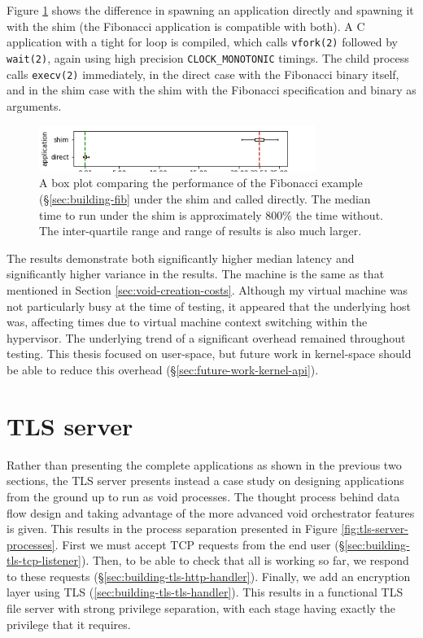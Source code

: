 \documentclass[12pt,a4paper,twoside]{report}
\begin{document}
Figure \ref{fig:fib-launch-times} shows the difference in spawning an application directly and spawning it with the shim (the Fibonacci application is compatible with both). A C application with a tight for loop is compiled, which calls \texttt{vfork(2)} followed by \texttt{wait(2)}, again using high precision \texttt{CLOCK\_MONOTONIC} timings. The child process calls \texttt{execv(2)} immediately, in the direct case with the Fibonacci binary itself, and in the shim case with the shim with the Fibonacci specification and binary as arguments.

\begin{figure}
    \centering
    \includegraphics[width=0.8\textwidth]{graphs/fib_startup.png}

    \caption{A box plot comparing the performance of the Fibonacci example (§\ref{sec:building-fib} under the shim and called directly. The median time to run under the shim is approximately 800\% the time without. The inter-quartile range and range of results is also much larger.}
    \label{fig:fib-launch-times}
\end{figure}

The results demonstrate both significantly higher median latency and significantly higher variance in the results. The machine is the same as that mentioned in Section \ref{sec:void-creation-costs}. Although my virtual machine was not particularly busy at the time of testing, it appeared that the underlying host was, affecting times due to virtual machine context switching within the hypervisor. The underlying trend of a significant overhead remained throughout testing. This thesis focused on user-space, but future work in kernel-space should be able to reduce this overhead (§\ref{sec:future-work-kernel-api}).

\section{TLS server}
\label{sec:building-tls}

Rather than presenting the complete applications as shown in the previous two sections, the TLS server presents instead a case study on designing applications from the ground up to run as void processes. The thought process behind data flow design and taking advantage of the more advanced void orchestrator features is given. This results in the process separation presented in Figure \ref{fig:tls-server-processes}. First we must accept TCP requests from the end user (§\ref{sec:building-tls-tcp-listener}). Then, to be able to check that all is working so far, we respond to these requests (§\ref{sec:building-tls-http-handler}). Finally, we add an encryption layer using TLS (\ref{sec:building-tls-tls-handler}). This results in a functional TLS file server with strong privilege separation, with each stage having exactly the privilege that it requires.
\end{document}
